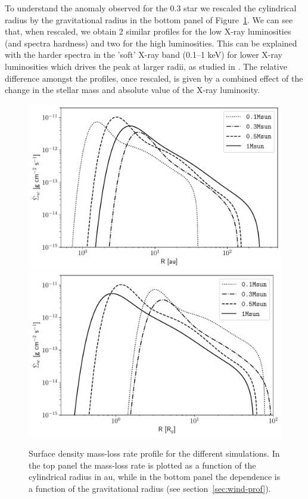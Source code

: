 \documentclass[usenatbib,useAMS,usedcolumn]{mnras}
\begin{document}
To understand the anomaly observed for the \SI{0.3}{\solarmass} star we rescaled the cylindrical radius by the gravitational radius in the bottom panel of Figure~\ref{fig:Sigmadot}.
We can see that, when rescaled, we obtain 2 similar profiles for the low X-ray luminosities (and spectra hardness) and two for the high luminosities. This can be explained with the harder spectra in the 'soft' X-ray band (0.1–1 keV) for lower X-ray luminosities which drives the peak at larger radii, as studied in . The relative difference amongst the profiles, once rescaled, is given by a combined effect of the change in the stellar mass and absolute value of the X-ray luminosity.
\begin{figure}
  \centering
  \includegraphics[width=\columnwidth]{Figure7a}
  \includegraphics[width=\columnwidth]{Figure7b}
  \caption{Surface density mass-loss rate profile for the different simulations. In the top panel the mass-loss rate is plotted as a function of the cylindrical radius in au, while in the bottom panel the dependence is a function of the gravitational radius (see section~\ref{sec:wind-prof}). \label{fig:Sigmadot}}
\end{figure}
\end{document}
